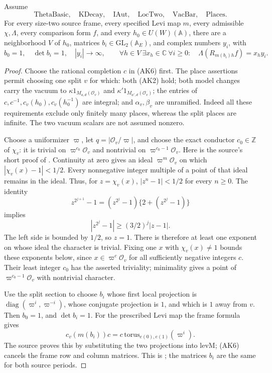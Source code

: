 \begin{srproposition}
\label{prop:sr-source-key-two-producer}
Assume
\[
 \mathrm{ThetaBasic},\quad\mathrm{KDecay},\quad\mathrm{IAut},
 \quad\mathrm{LocTwo},\quad\mathrm{VacBar},\quad\mathrm{Places}.
\]
For every size-two source frame, every specified Levi map \(m\),
every admissible \(\chi,\Lambda\), every comparison form \(f\),
and every \(h_0\in U(W)(\mathbb A)\), there are a neighborhood
\(V\) of \(h_0\), matrices \(b_i\in\mathrm{GL}_2(\mathbb A_E)\),
and complex numbers \(y_i\), with
\[
 b_0=1,\quad \det b_i=1,\quad |y_i|\longrightarrow\infty,
 \qquad
 \forall h\in V\ \exists x_h\in\mathbb C\
 \forall i\ge0:\quad
              \Lambda(R_{m(b_i)h}f)=x_hy_i.
 \tag{AK10}\label{eq:sr-source-key-two-conclusion}
\]
\end{srproposition}
\begin{proof}
Choose the rational completion \(c\) in (AK6) first.
The place assertions permit choosing one split \(v\) for which:
both (AK2) hold; both model changes carry the vacuum to
\(\kappa1_{M_{a,d}(\mathcal O_v)}\) and
\(\kappa'1_{M_{a',d}(\mathcal O_v)}\);
the entries of \(c,c^{-1},c_v(h_0),c_v(h_0^{-1})\) are integral;
and \(\alpha_v,\beta_v\) are unramified.
Indeed all these requirements exclude only finitely many places,
whereas the split places are infinite.
The two vacuum scalars are not assumed nonzero.

Choose a uniformizer \(\varpi\), let \(q=|\mathcal O_v/\varpi|\),
and choose the exact conductor \(c_0\in\mathbb Z\) of
\(\chi_v\): it is trivial on \(\varpi^{c_0}\mathcal O_v\) and
nontrivial on \(\varpi^{c_0-1}\mathcal O_v\).
Here is the source's short proof of .
Continuity at zero gives an ideal \(\varpi^m\mathcal O_v\)
on which \(|\chi_v(x)-1|<1/2\).
Every nonnegative integer multiple of a point of that ideal
remains in the ideal. Thus, for \(z=\chi_v(x)\),
\(|z^n-1|<1/2\) for every \(n\ge0\).
The identity
\[
 z^{2^{j+1}}-1=(z^{2^j}-1)\{2+(z^{2^j}-1)\}
\]
implies
\[
 |z^{2^j}-1|\ge(3/2)^j|z-1|.
\]
The left side is bounded by \(1/2\), so \(z=1\).
There is therefore at least one exponent on whose ideal
the character is trivial. Fixing one \(x\) with
\(\chi_v(x)\ne1\) bounds these exponents below, since
\(x\in\varpi^c\mathcal O_v\) for all sufficiently negative
integers \(c\).
Their least integer \(c_0\) has the asserted triviality;
minimality gives a point of
\(\varpi^{c_0-1}\mathcal O_v\) with nontrivial character.

Use the split section to choose \(b_i\) whose first local projection
is \(\operatorname{diag}(\varpi^i,\varpi^{-i})\), whose conjugate
projection is \(1\), and which is \(1\) away from \(v\).
Then \(b_0=1\), and \(\det b_i=1\).
For the prescribed Levi map the frame formula gives
\[
 c_v(m(b_i))c
   =c\,\mathrm{torus}_{e(0),e(1)}(\varpi^i).
 \tag{AK11}\label{eq:sr-source-key-two-torus}
\]
The source proves this by substituting the two projections into
\(\mathrm{levM}\); (AK6) cancels the frame row and column matrices.
This is \srcid{exists\_torus}; the matrices \(b_i\) are the same for
both source periods.


\end{proof}
